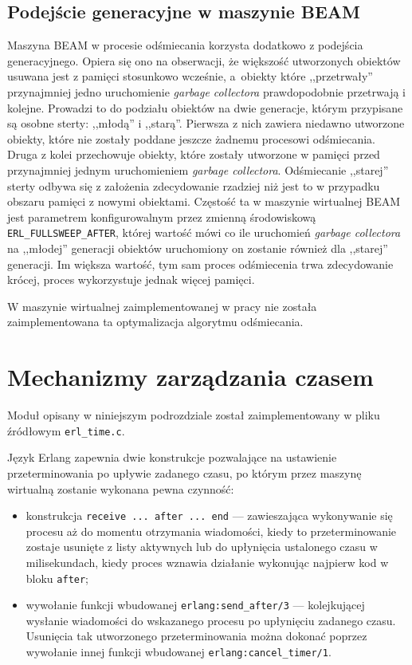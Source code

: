 \subsection{Podejście generacyjne w maszynie BEAM}
\label{sub:gcGeneracje}

Maszyna BEAM w procesie odśmiecania korzysta dodatkowo z podejścia generacyjnego.
Opiera się ono na obserwacji, że większość utworzonych obiektów usuwana jest z pamięci stosunkowo wcześnie, a~obiekty które ,,przetrwały'' przynajmniej jedno uruchomienie \emph{garbage collectora} prawdopodobnie przetrwają i kolejne.
Prowadzi to do podziału obiektów na dwie generacje, którym przypisane są osobne sterty: ,,młodą'' i ,,starą''.
Pierwsza z nich zawiera niedawno utworzone obiekty, które nie zostały poddane jeszcze żadnemu procesowi odśmiecania.
Druga z kolei przechowuje obiekty, które zostały utworzone w pamięci przed przynajmniej jednym uruchomieniem \emph{garbage collectora}.
Odśmiecanie ,,starej'' sterty odbywa się z założenia zdecydowanie rzadziej niż jest to w przypadku obszaru pamięci z nowymi obiektami.
Częstość ta w maszynie wirtualnej BEAM jest parametrem konfigurowalnym przez zmienną środowiskową \texttt{ERL\_FULLSWEEP\_AFTER}, której wartość mówi co ile uruchomień \emph{garbage collectora} na ,,młodej'' generacji obiektów uruchomiony on zostanie również dla ,,starej'' generacji.
Im większa wartość, tym sam proces odśmiecenia trwa zdecydowanie krócej, proces wykorzystuje jednak więcej pamięci.

W maszynie wirtualnej zaimplementowanej w pracy nie została zaimplementowana ta optymalizacja algorytmu odśmiecania. 


\section{Mechanizmy zarządzania czasem}
\label{sec:maszynaTimer}

Moduł opisany w niniejszym podrozdziale został zaimplementowany w pliku źródłowym \texttt{erl\_time.c}.

Język Erlang zapewnia dwie konstrukcje pozwalające na ustawienie przeterminowania po upływie zadanego czasu, po którym przez maszynę wirtualną zostanie wykonana pewna czynność:
\begin{itemize}
\item konstrukcja \texttt{receive ... after ... end} --- zawieszająca wykonywanie się procesu aż do momentu otrzymania wiadomości, kiedy to przeterminowanie zostaje usunięte z listy aktywnych lub do upłynięcia ustalonego czasu w milisekundach, kiedy proces wznawia działanie wykonując najpierw kod w bloku \texttt{after};
\item wywołanie funkcji wbudowanej \texttt{erlang:send\_after/3} --- kolejkującej wysłanie wiadomości do wskazanego procesu po upłynięciu zadanego czasu. Usunięcia tak utworzonego przeterminowania można dokonać poprzez wywołanie innej funkcji wbudowanej \texttt{erlang:cancel\_timer/1}.
\end{itemize}

